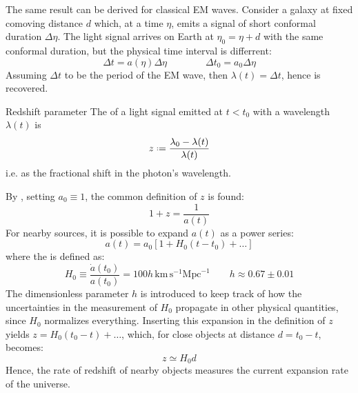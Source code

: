 The same result can be derived for classical EM waves. Consider a galaxy at fixed comoving distance $ d $ which, at a time $ \eta $, emits a signal of short conformal duration $ \Delta \eta $. The light signal arrives on Earth at $ \eta_0 = \eta + d $ with the same conformal duration, but the physical time interval is differrent:
\begin{equation*}
  \Delta t = a(\eta) \Delta \eta
  \qquad \qquad
  \Delta t_0 = a_0 \Delta \eta
\end{equation*}
Assuming $ \Delta t $ to be the period of the EM wave, then $ \lambda(t) = \Delta t $, hence  is recovered.

\begin{definition}{Redshift parameter}{}
  The  of a light signal emitted at $ t < t_0 $ with a wavelength $ \lambda(t) $ is
  \begin{equation}
    z \defeq \frac{\lambda_0 - \lambda(t)}{\lambda(t)}
  \end{equation}
  i.e. as the fractional shift in the photon's wavelength.
\end{definition}

By , setting $ a_0 \equiv 1 $, the common definition of $ z $ is found:
\begin{equation}
  1 + z = \frac{1}{a(t)}
  \label{eq:redshift-a}
\end{equation}
For nearby sources, it is possible to expand $ a(t) $ as a power series:
\begin{equation*}
  a(t) = a_0 \left[ 1 + H_0 (t - t_0) + \dots \right]
\end{equation*}
where the  is defined as:
\begin{equation}
  H_0 \equiv \frac{\dot{a}(t_0)}{a(t_0)} = 100 h \, \text{km} \, \text{s}^{-1} \text{Mpc}^{-1}
  \qquad
  h \approx 0.67 \pm 0.01
\end{equation}
The dimensionless parameter $ h $ is introduced to keep track of how the uncertainties in the measurement of $ H_0 $ propagate in other physical quantities, since $ H_0 $ normalizes everything.
Inserting this expansion in the definition of $ z $ yields $ z = H_0 (t_0 - t) + \dots $, which, for close objects at distance $ d = t_0 - t $, becomes:
\begin{equation}
  z \simeq H_0 d
\end{equation}
Hence, the rate of redshift of nearby objects measures the current expansion rate of the universe.

